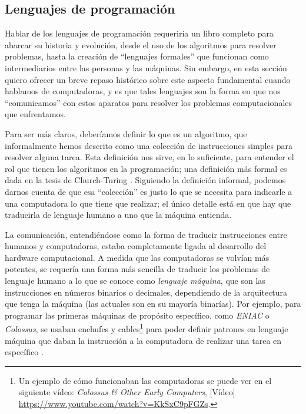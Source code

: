 \documentclass[letterpaper,12pt,oneside]{book}
\begin{document}
		
		\clearpage
		\subsection{Lenguajes de programación}
		
		Hablar de los lenguajes de programación requeriría un libro completo para abarcar su historia y evolución, desde el uso de los algoritmos
		para resolver problemas, hasta la creación de ``lenguajes formales'' que funcionan como intermediarios entre las personas y las máquinas. Sin embargo,
		en esta sección quiero ofrecer un breve repaso histórico sobre este aspecto fundamental cuando hablamos de computadoras, y es que tales lenguajes
		son la forma en que nos ``comunicamos'' con estos aparatos para resolver los problemas computacionales que enfrentamos.
		
		Para ser más claros, deberíamos definir lo que es un algoritmo, que informalmente hemos descrito como una colección de instrucciones simples para
		resolver alguna tarea. Esta definición nos sirve, en lo suficiente, para entender el rol que tienen los algoritmos en la programación; una definición más formal es dada en la tesis de Church-Turing \cite{sipser_introduction_2013}. Siguiendo la definición informal,
		podemos darnos cuenta de que esa ``colección'' es justo lo que se necesita para indicarle a una computadora lo que tiene que realizar; el único
		detalle está en que hay que traducirla de lenguaje humano a uno que la máquina entienda.
		
		La comunicación, entendiéndose como la forma de traducir instrucciones entre humanos y computadoras, estaba		
		completamente ligada al desarrollo del hardware computacional. A medida que las computadoras se volvían más potentes, se requería
		una forma más sencilla de traducir los problemas de lenguaje humano a lo que se conoce como \textit{lenguaje máquina}, que son las instrucciones en números
		binarios o decimales, dependiendo de la arquitectura que tenga la máquina (las actuales son en su mayoría binarías). Por ejemplo, para programar las primeras máquinas
		de propósito específico, como \textit{ENIAC} o \textit{Colossus}, se usaban enchufes y cables\footnote{Un ejemplo de cómo funcionaban las computadoras se puede ver en el siguiente vídeo: \emph{ 
		Colossus \& Other Early Computers}, [Vídeo] \url{https://www.youtube.com/watch?v=KkSxC9pFGZs}. } para poder definir patrones en lenguaje máquina que daban la instrucción a la computadora de 	
		realizar una tarea en específico \cite[p. 8]{tanenbaum_modern_2002}. 
		
\end{document}
